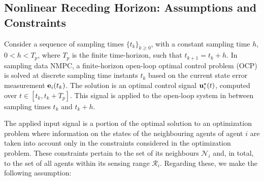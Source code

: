 \subsection{Nonlinear Receding Horizon: Assumptions and Constraints}

Consider a sequence of sampling times $\{t_k\}_{k \geq 0}$, with a constant
sampling time $h$, $0 < h < T_p$, where $T_p$ is the finite time-horizon, such
that $t_{k+1} = t_k + h$. In sampling data NMPC, a finite-horizon open-loop
optimal control problem (OCP) is solved at discrete sampling time instants $t_k$
based on the current state error measurement $\bm{\mathbf{e}}_i(t_k)$. The solution
is an optimal control signal $\bm{\mathbf{u}}_i^{\star}(t)$, computed over
$t \in [t_k, t_k+T_p]$. This signal is applied to the open-loop system in
between sampling times $t_k$ and $t_k + h$.

The applied input signal is a
portion of the optimal solution to an optimization problem where information on
the states of the neighbouring agents of agent $i$ are taken into account only
in the constraints considered in the optimization problem. These constraints
pertain to the set of its neighbours $\mathcal{N}_i$ and, in total, to the
set of all agents within its sensing range $\mathcal{R}_i$. Regarding these, we
make the following assumption:

